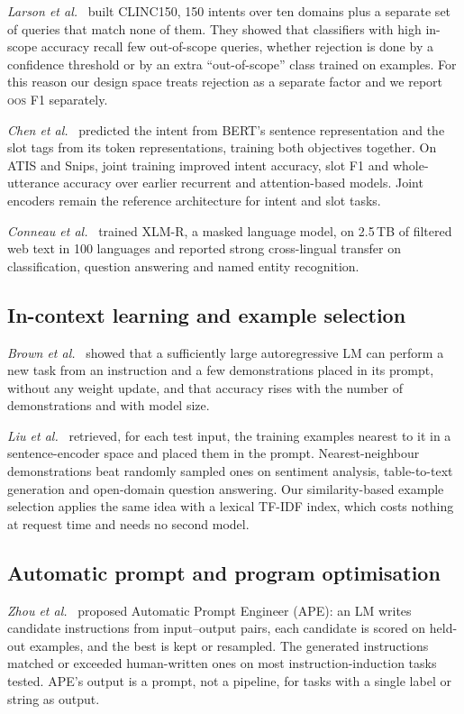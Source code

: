 \documentclass[conference]{IEEEtran}
\newcommand{\oos}{\textsc{oos}}
\begin{document}
\emph{Larson et al.}~\cite{larson2019evaluation} built CLINC150, 150 intents over ten domains plus a separate set of queries that match none of them. They showed that classifiers with high in-scope accuracy recall few out-of-scope queries, whether rejection is done by a confidence threshold or by an extra ``out-of-scope'' class trained on examples. For this reason our design space treats rejection as a separate factor and we report \oos{} F1 separately.

\emph{Chen et al.}~\cite{chen2019bert} predicted the intent from BERT's sentence representation and the slot tags from its token representations, training both objectives together. On ATIS and Snips, joint training improved intent accuracy, slot F1 and whole-utterance accuracy over earlier recurrent and attention-based models. Joint encoders remain the reference architecture for intent and slot tasks.

\emph{Conneau et al.}~\cite{conneau2020unsupervised} trained XLM-R, a masked language model, on 2.5\,TB of filtered web text in 100 languages and reported strong cross-lingual transfer on classification, question answering and named entity recognition.

\subsection{In-context learning and example selection}

\emph{Brown et al.}~\cite{brown2020language} showed that a sufficiently large autoregressive LM can perform a new task from an instruction and a few demonstrations placed in its prompt, without any weight update, and that accuracy rises with the number of demonstrations and with model size.

\emph{Liu et al.}~\cite{liu2022makes} retrieved, for each test input, the training examples nearest to it in a sentence-encoder space and placed them in the prompt. Nearest-neighbour demonstrations beat randomly sampled ones on sentiment analysis, table-to-text generation and open-domain question answering. Our similarity-based example selection applies the same idea with a lexical TF-IDF index, which costs nothing at request time and needs no second model.

\subsection{Automatic prompt and program optimisation}

\emph{Zhou et al.}~\cite{zhou2023large} proposed Automatic Prompt Engineer (APE): an LM writes candidate instructions from input--output pairs, each candidate is scored on held-out examples, and the best is kept or resampled. The generated instructions matched or exceeded human-written ones on most instruction-induction tasks tested. APE's output is a prompt, not a pipeline, for tasks with a single label or string as output.
\end{document}

